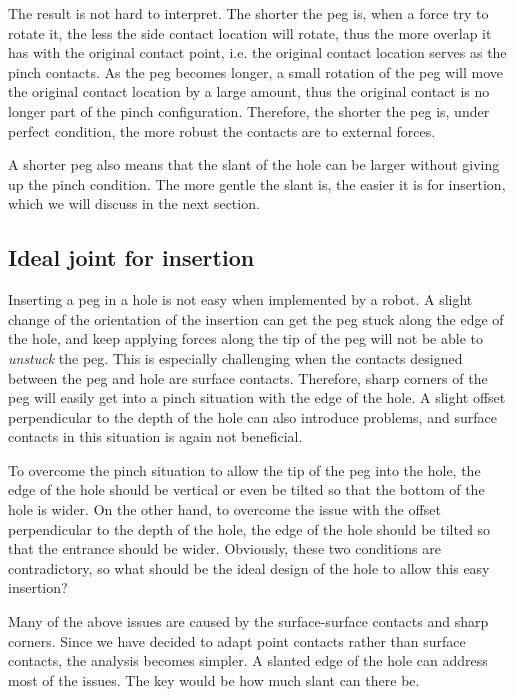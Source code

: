 \documentclass[11pt, twocolumn]{article}
\begin{document}
The result is not hard to interpret. The shorter the peg is, when a force try to rotate it, the less the side contact location will rotate, thus the more overlap it has with the original contact point, i.e. the original contact location serves as the pinch contacts. As the peg becomes longer, a small rotation of the peg will move the original contact location by a large amount, thus the original contact is no longer part of the pinch configuration. Therefore, the shorter the peg is, under perfect condition, the more robust the contacts are to external forces. 

A shorter peg also means that the slant of the hole can be larger without giving up the pinch condition. The more gentle the slant is, the easier it is for insertion, which we will discuss in the next section. 



\subsection{Ideal joint for insertion}

Inserting a peg in a hole is not easy when implemented by a robot. A slight change of the orientation of the insertion can get the peg stuck along the edge of the hole, and keep applying forces along the tip of the peg will not be able to {\em unstuck} the peg. This is especially challenging when the contacts designed between the peg and hole are surface contacts. Therefore, sharp corners of the peg will easily get into a pinch situation with the edge of the hole. A slight offset perpendicular to the depth of the hole can also introduce problems, and surface contacts in this situation is again not beneficial. 

To overcome the pinch situation to allow the tip of the peg into the hole, the edge of the hole should be vertical or even be tilted so that the bottom of the hole is wider. On the other hand, to overcome the issue with the offset perpendicular to the depth of the hole, the edge of the hole should be tilted so that the entrance should be wider. Obviously, these two conditions are contradictory, so what should be the ideal design of the hole to allow this easy insertion? 


Many of the above issues are caused by the surface-surface contacts and sharp corners. Since we have decided to adapt point contacts rather than surface contacts, the analysis becomes simpler. A slanted edge of the hole can address most of the issues. The key would be how much slant can there be. 
\end{document}

